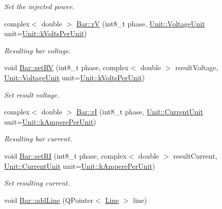 \begin{DoxyCompactItemize}
\begin{DoxyCompactList}\small\item\em Set the injected power. \end{DoxyCompactList}\item 
complex$<$ double $>$ \hyperlink{group___models_ga6c83eb997f5038e0b9bbd5472582e0a8}{Bar\+::r\+V} (int8\+\_\+t phase, \hyperlink{class_unit_a55b07dfa9457e1eca2c7194fe0cfc3c1}{Unit\+::\+Voltage\+Unit} unit=\hyperlink{class_unit_a55b07dfa9457e1eca2c7194fe0cfc3c1ab44b1310b59fdcdc9df5bbea91da4206}{Unit\+::k\+Volts\+Per\+Unit})
\begin{DoxyCompactList}\small\item\em Resulting bar voltage. \end{DoxyCompactList}\item 
void \hyperlink{group___models_ga96ab396a6e953a0356f60adb1784ee37}{Bar\+::set\+R\+V} (int8\+\_\+t phase, complex$<$ double $>$ result\+Voltage, \hyperlink{class_unit_a55b07dfa9457e1eca2c7194fe0cfc3c1}{Unit\+::\+Voltage\+Unit} unit=\hyperlink{class_unit_a55b07dfa9457e1eca2c7194fe0cfc3c1ab44b1310b59fdcdc9df5bbea91da4206}{Unit\+::k\+Volts\+Per\+Unit})
\begin{DoxyCompactList}\small\item\em Set result voltage. \end{DoxyCompactList}\item 
complex$<$ double $>$ \hyperlink{group___models_ga50eb46f3510205a9d6cb5e6547fa86df}{Bar\+::r\+I} (int8\+\_\+t phase, \hyperlink{class_unit_a0794cf6c9682f48296dd4a5315389787}{Unit\+::\+Current\+Unit} unit=\hyperlink{class_unit_a0794cf6c9682f48296dd4a5315389787aeed3b50e464d581cb630181a3b6a0709}{Unit\+::k\+Ampere\+Per\+Unit})
\begin{DoxyCompactList}\small\item\em Resulting bar current. \end{DoxyCompactList}\item 
void \hyperlink{group___models_gaf7a406f8952b1e874c95c41b0955d250}{Bar\+::set\+R\+I} (int8\+\_\+t phase, complex$<$ double $>$ result\+Current, \hyperlink{class_unit_a0794cf6c9682f48296dd4a5315389787}{Unit\+::\+Current\+Unit} unit=\hyperlink{class_unit_a0794cf6c9682f48296dd4a5315389787aeed3b50e464d581cb630181a3b6a0709}{Unit\+::k\+Ampere\+Per\+Unit})
\begin{DoxyCompactList}\small\item\em Set resulting current. \end{DoxyCompactList}\item 
void \hyperlink{group___models_gabb1a3b7653d4e2327c4bf728210f197e}{Bar\+::add\+Line} (Q\+Pointer$<$ \hyperlink{class_line}{Line} $>$ line)

\end{DoxyCompactItemize}
